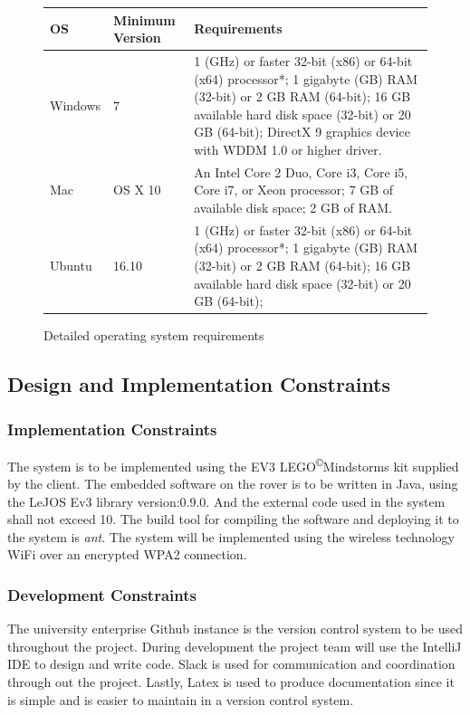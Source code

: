 \documentclass[10pt,a4paper,titlepage]{article}
\newcommand{\cpright}{\textsuperscript{\tiny\copyright}}
\begin{document}
	\begin{figure}
		\centering
		\begin{tabular}{|p{2cm}|p{2cm}|p{7cm}|}
			\hline 
			\textbf{OS} &\textbf{Minimum Version} & \textbf{Requirements} \\ 
			\hline 
			Windows & 7 & 1 (GHz) or faster 32-bit (x86) or 64-bit (x64) processor*;
			1 gigabyte (GB) RAM (32-bit) or 2 GB RAM (64-bit);
			16 GB available hard disk space (32-bit) or 20 GB (64-bit);
			DirectX 9 graphics device with WDDM 1.0 or higher driver. \\ 
			\hline 
			Mac & OS X 10 & An Intel Core 2 Duo, Core i3, Core i5, Core i7, or Xeon processor;
			7 GB of available disk space;
			2 GB of RAM. \\ 
			\hline 
			Ubuntu & 16.10 & 1 (GHz) or faster 32-bit (x86) or 64-bit (x64) processor*;
			1 gigabyte (GB) RAM (32-bit) or 2 GB RAM (64-bit);
			16 GB available hard disk space (32-bit) or 20 GB (64-bit); \\
			\hline 
		\end{tabular} 
		\caption{Detailed operating system requirements}
		\label{fig:tab Os Requirements}
	\end{figure}
	
	\subsection{Design and Implementation Constraints}
	\subsubsection*{Implementation Constraints}
	The system is to be implemented using the EV3 LEGO\cpright Mindstorms kit supplied by the client. The embedded software on the rover is to be written in Java, using the LeJOS Ev3 library version:0.9.0. And the external code used in the system shall not exceed 10. The build tool for compiling the software and deploying it to the system is \textit{ant}. The system will be implemented using the wireless technology WiFi over an encrypted WPA2 connection.
	
	\subsubsection*{Development Constraints}
	The university enterprise Github instance is the version control system to be used throughout the project. During development the project team will use the IntelliJ IDE to design and write code. Slack is used for communication and coordination through out the project. Lastly, Latex is used to produce documentation since it is simple and is easier to maintain in a version control system.
	
\end{document}
